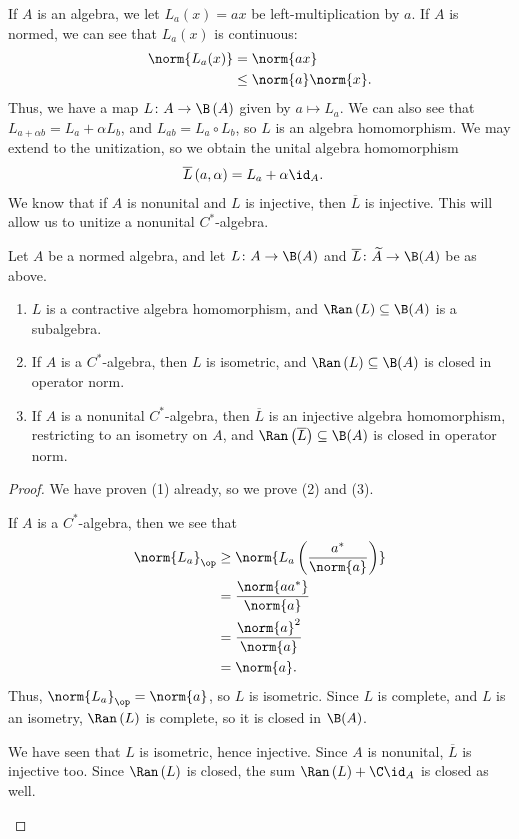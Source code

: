 \documentclass[10pt]{mypackage}
\begin{document}
If $A$ is an algebra, we let $L_a(x) = ax$ be left-multiplication by $a$. If $A$ is normed, we can see that $L_a(x)$ is continuous:
\begin{align*}
  \norm{L_a(x)} &= \norm{ax}\\
                &\leq \norm{a}\norm{x}.
\end{align*}
Thus, we have a map $L\colon A\rightarrow \B\left(A\right)$ given by $a\mapsto L_a$. We can also see that $L_{a + \alpha b} = L_a + \alpha L_b$, and $L_{ab} = L_a\circ L_b$, so $L$ is an algebra homomorphism. We may extend to the unitization, so we obtain the unital algebra homomorphism
\begin{align*}
  \overline{L}\left(a,\alpha\right) &= L_a + \alpha \id_A.
\end{align*}
We know that if $A$ is nonunital and $L$ is injective, then $\overline{L}$ is injective. This will allow us to unitize a nonunital $C^{\ast}$-algebra.
\begin{lemma}
  Let $A$ be a normed algebra, and let $L\colon A\rightarrow \B(A)$ and $\overline{L}\colon \widetilde{A}\rightarrow \B(A)$ be as above.
  \begin{enumerate}[(1)]
    \item $L$ is a contractive algebra homomorphism, and $\Ran\left(L\right)\subseteq \B(A)$ is a subalgebra.
    \item If $A$ is a $C^{\ast}$-algebra, then $L$ is isometric, and $\Ran\left(L\right)\subseteq \B(A)$ is closed in operator norm.
    \item If $A$ is a nonunital $C^{\ast}$-algebra, then $\overline{L}$ is an injective algebra homomorphism, restricting to an isometry on $A$, and $\Ran\left(\overline{L}\right)\subseteq \B(A)$ is closed in operator norm.
  \end{enumerate}
\end{lemma}
\begin{proof}
  We have proven (1) already, so we prove (2) and (3).
  \begin{description}[font=\normalfont]
    \item[(2)] If $A$ is a $C^{\ast}$-algebra, then we see that
      \begin{align*}
        \norm{L_a}_{\op} &\geq \norm{L_a\left(\frac{a^{\ast}}{\norm{a}}\right)}\\
                         &= \frac{\norm{aa^{\ast}}}{\norm{a}}\\
                         &= \frac{\norm{a}^2}{\norm{a}}\\
                         &= \norm{a}.
      \end{align*}
      Thus, $\norm{L_a}_{\op} = \norm{a}$, so $L$ is isometric. Since $L$ is complete, and $L$ is an isometry, $\Ran\left(L\right)$ is complete, so it is closed in $\B(A)$.
    \item We have seen that $L$ is isometric, hence injective. Since $A$ is nonunital, $\overline{L}$ is injective too. Since $\Ran\left(L\right)$ is closed, the sum $\Ran\left(L\right) + \C\id_{A}$ is closed as well.
  \end{description}
\end{proof}
\end{document}
